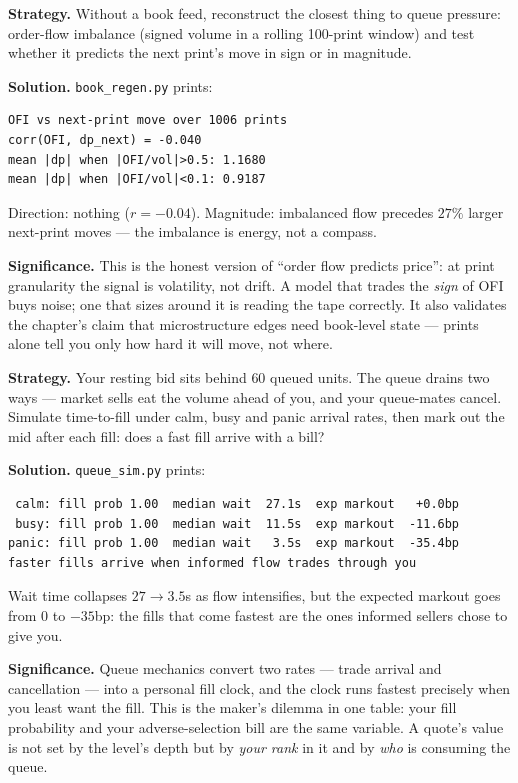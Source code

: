 \begin{example}\label{ex:ofi}
\textbf{Strategy.} Without a book feed, reconstruct the closest
thing to queue pressure: order-flow imbalance (signed volume in a
rolling 100-print window) and test whether it predicts the next
print's move in sign or in magnitude.

\textbf{Solution.} \texttt{book\_regen.py} prints:
\begin{verbatim}
OFI vs next-print move over 1006 prints
corr(OFI, dp_next) = -0.040
mean |dp| when |OFI/vol|>0.5: 1.1680
mean |dp| when |OFI/vol|<0.1: 0.9187
\end{verbatim}
Direction: nothing ($r=-0.04$). Magnitude: imbalanced flow
precedes $27\%$ larger next-print moves --- the imbalance is
energy, not a compass.

\textbf{Significance.} This is the honest version of ``order flow
predicts price'': at print granularity the signal is volatility,
not drift. A model that trades the \emph{sign} of OFI buys noise;
one that sizes around it is reading the tape correctly. It also
validates the chapter's claim that microstructure edges need
book-level state --- prints alone tell you only how hard it will
move, not where.
\end{example}

\begin{example}\label{ex:queue}
\textbf{Strategy.} Your resting bid sits behind $60$ queued units.
The queue drains two ways --- market sells eat the volume ahead of
you, and your queue-mates cancel. Simulate time-to-fill under calm,
busy and panic arrival rates, then mark out the mid after each
fill: does a fast fill arrive with a bill?

\textbf{Solution.} \texttt{queue\_sim.py} prints:
\begin{verbatim}
 calm: fill prob 1.00  median wait  27.1s  exp markout   +0.0bp
 busy: fill prob 1.00  median wait  11.5s  exp markout  -11.6bp
panic: fill prob 1.00  median wait   3.5s  exp markout  -35.4bp
faster fills arrive when informed flow trades through you
\end{verbatim}
Wait time collapses $27\to3.5$s as flow intensifies, but the
expected markout goes from $0$ to $-35$bp: the fills that come
fastest are the ones informed sellers chose to give you.

\textbf{Significance.} Queue mechanics convert two rates ---
trade arrival and cancellation --- into a personal fill clock, and
the clock runs fastest precisely when you least want the fill.
This is the maker's dilemma in one table: your fill probability
and your adverse-selection bill are the same variable. A quote's
value is not set by the level's depth but by \emph{your rank} in it
and by \emph{who} is consuming the queue.
\end{example}

